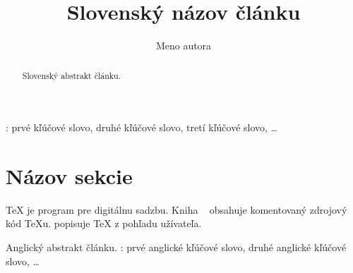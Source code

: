 \documentclass{csbulletin}
\begin{document}
\title{Slovenský názov článku}
\author{Meno autora}
\maketitle

\begin{abstract}
Slovenský abstrakt článku.
\end{abstract}
\klucoveslova: prvé kľúčové slovo, druhé kľúčové slovo, tretí kľúčové slovo, …

\section{Názov sekcie}
\TeX{} je program pre digitálnu sadzbu. Kniha ~\cite{knuth-ttp} obsahuje komentovaný zdrojový kód \TeX u. \textcite{knuth-tb} popisuje \TeX{} z pohľadu užívateľa.

\printbibliography

\begin{summary}
Anglický abstrakt článku.
\keywords: prvé anglické kľúčové slovo, druhé anglické kľúčové slovo, …
\end{summary}
\end{document}
